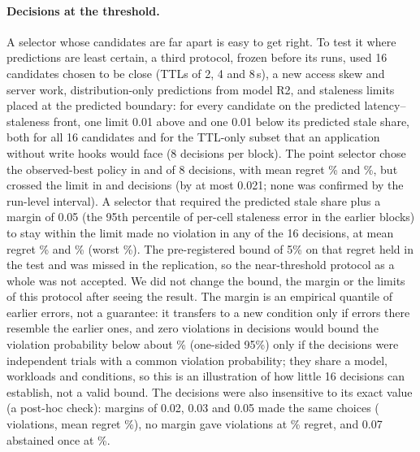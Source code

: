 \documentclass[acmsmall,review,nonacm]{acmart}
\begin{document}
\paragraph{Decisions at the threshold.}
A selector whose candidates are far apart is easy to get right. To test it where predictions are least certain, a third protocol, frozen before its runs, used 16 candidates chosen to be close (TTLs of 2, 4 and 8\,s), a new access skew and server work, distribution-only predictions from model R2, and staleness limits placed at the predicted boundary: for every candidate on the predicted latency--staleness front, one limit 0.01 above and one 0.01 below its predicted stale share, both for all 16 candidates and for the TTL-only subset that an application without write hooks would face (8 decisions per block). The point selector chose the observed-best policy in \revHTNaiveRight{} and \revHRNaiveRight{} of 8 decisions, with mean regret \revHTNaiveRegret\% and \revHRNaiveRegret\%, but crossed the limit in \revHTNaiveViol{} and \revHRNaiveViol{} decisions (by at most 0.021; none was confirmed by the run-level interval). A selector that required the predicted stale share plus a margin of 0.05 (the 95th percentile of per-cell staleness error in the earlier blocks) to stay within the limit made no violation in any of the 16 decisions, at mean regret \revHTAwareRegret\% and \revHRAwareRegret\% (worst \revHRAwareWorst\%). The pre-registered bound of 5\% on that regret held in the test and was missed in the replication, so the near-threshold protocol as a whole was not accepted. We did not change the bound, the margin or the limits of this protocol after seeing the result. The margin is an empirical quantile of earlier errors, not a guarantee: it transfers to a new condition only if errors there resemble the earlier ones, and zero violations in \marginFiveDec{} decisions would bound the violation probability below about \marginUpper\% (one-sided 95\%) only if the decisions were independent trials with a common violation probability; they share a model, workloads and conditions, so this is an illustration of how little 16 decisions can establish, not a valid bound. The decisions were also insensitive to its exact value (a post-hoc check): margins of 0.02, 0.03 and 0.05 made the same \marginFiveDec{} choices (\marginTwoViol{} violations, mean regret \marginFiveRegret\%), no margin gave \marginZeroViol{} violations at \marginZeroRegret\% regret, and 0.07 abstained once at \marginSevenRegret\%.
\end{document}
